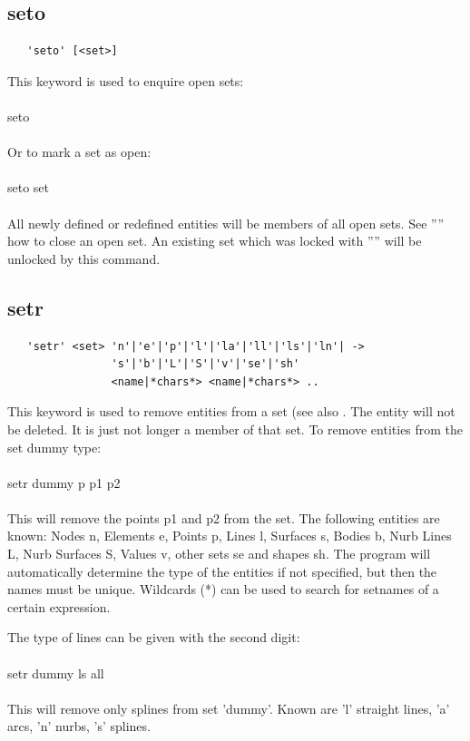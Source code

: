 \documentclass{article}
\begin{document}
\subsection{\label{seto}seto}
\begin{verbatim}
   'seto' [<set>] 
\end{verbatim}
This keyword is used to enquire open sets:\\\\
seto\\\\
Or to mark a set as open:\\\\
seto set\\\\
All newly defined or redefined entities will be members of all open sets. See '''' how to close an open set. An existing set which was locked with '''' will be unlocked by this command.

\subsection{\label{setr}setr}
\begin{verbatim}
   'setr' <set> 'n'|'e'|'p'|'l'|'la'|'ll'|'ls'|'ln'| ->
                's'|'b'|'L'|'S'|'v'|'se'|'sh'
                <name|*chars*> <name|*chars*> .. 
\end{verbatim}
This keyword is used to remove entities from a set (see also . The entity will not be deleted. It is just not longer a member of that set. To remove entities from the set dummy type:\\\\setr dummy p p1 p2\\\\This will remove the points p1 and p2 from the set. The following entities are known: Nodes n, Elements e, Points p, Lines l, Surfaces s, Bodies b, Nurb Lines L, Nurb Surfaces S, Values v, other sets se and shapes sh. The program will automatically determine the type of the entities if not specified, but then the names must be unique. Wildcards (*) can be used to search for setnames of a certain expression.

The type of lines can be given with the second digit:\\\\setr dummy ls
all\\\\This will remove only splines from set 'dummy'. Known are 'l' straight
lines, 'a' arcs, 'n' nurbs, 's' splines.
\end{document}
